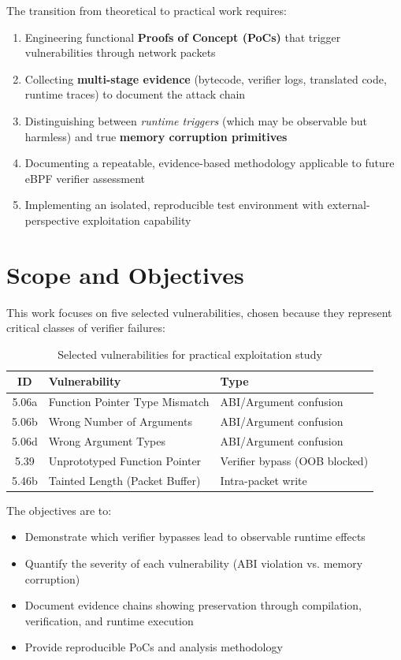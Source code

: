 \noindent
The transition from theoretical to practical work requires:
\begin{enumerate}[label=\arabic*.]
  \item Engineering functional \textbf{Proofs of Concept (PoCs)} that trigger vulnerabilities through network packets
  \item Collecting \textbf{multi-stage evidence} (bytecode, verifier logs, translated code, runtime traces) to document the attack chain
  \item Distinguishing between \textit{runtime triggers} (which may be observable but harmless) and true \textbf{memory corruption primitives}  
  \item Documenting a repeatable, evidence-based methodology applicable to future eBPF verifier assessment
  \item Implementing an isolated, reproducible test environment with external-perspective exploitation capability
\end{enumerate}

\section{Scope and Objectives}

This work focuses on five selected vulnerabilities, chosen because they represent critical classes of verifier failures:

\begin{table}[h!]
\centering
\begin{tabular}{|c|l|l|}
\hline
\textbf{ID} & \textbf{Vulnerability} & \textbf{Type} \\
\hline
5.06a & Function Pointer Type Mismatch & ABI/Argument confusion \\
5.06b & Wrong Number of Arguments & ABI/Argument confusion \\
5.06d & Wrong Argument Types & ABI/Argument confusion \\
5.39 & Unprototyped Function Pointer & Verifier bypass (OOB blocked) \\
5.46b & Tainted Length (Packet Buffer) & Intra-packet write \\
\hline
\end{tabular}
\caption{Selected vulnerabilities for practical exploitation study}
\end{table}

\noindent
The objectives are to:
\begin{itemize}
  \item Demonstrate which verifier bypasses lead to observable runtime effects
  \item Quantify the severity of each vulnerability (ABI violation vs. memory corruption)
  \item Document evidence chains showing preservation through compilation, verification, and runtime execution
  \item Provide reproducible PoCs and analysis methodology
\end{itemize}

